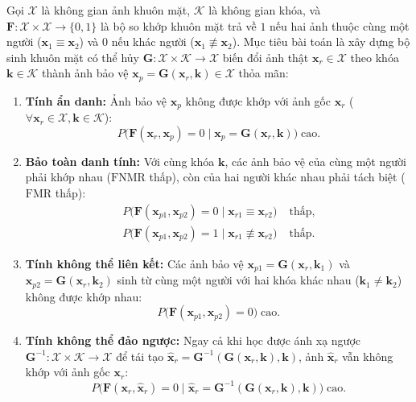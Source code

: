 Gọi $\mathcal{X}$ là không gian ảnh khuôn mặt, $\mathcal{K}$ là không gian khóa, và $\mathbf{F} : \mathcal{X} \times \mathcal{X} \rightarrow \{0, 1\}$ là bộ so khớp khuôn mặt trả về $1$ nếu hai ảnh thuộc cùng một người ($\mathbf{x}_1 \equiv \mathbf{x}_2$) và $0$ nếu khác người ($\mathbf{x}_1 \not\equiv \mathbf{x}_2$). Mục tiêu bài toán là xây dựng bộ sinh khuôn mặt có thể hủy $\mathbf{G} : \mathcal{X} \times \mathcal{K} \rightarrow \mathcal{X}$ biến đổi ảnh thật $\mathbf{x}_r \in \mathcal{X}$ theo khóa $\mathbf{k} \in \mathcal{K}$ thành ảnh bảo vệ $\mathbf{x}_p = \mathbf{G}(\mathbf{x}_r, \mathbf{k}) \in \mathcal{X}$ thỏa mãn:
\begin{enumerate}\setlength{\itemsep}{2pt}\setlength{\parskip}{0pt}
    \item \textbf{Tính ẩn danh:} Ảnh bảo vệ $\mathbf{x}_p$ không được khớp với ảnh gốc $\mathbf{x}_r$ ($\forall \mathbf{x}_r \in \mathcal{X}, \mathbf{k} \in \mathcal{K}$):
    \[
    P\bigl(\mathbf{F}(\mathbf{x}_r, \mathbf{x}_p) = 0 \mid \mathbf{x}_p = \mathbf{G}(\mathbf{x}_r, \mathbf{k})\bigr) \;\text{cao}.
    \]
    \item \textbf{Bảo toàn danh tính:} Với cùng khóa $\mathbf{k}$, các ảnh bảo vệ của cùng một người phải khớp nhau ($\text{FNMR}$ thấp), còn của hai người khác nhau phải tách biệt ($\text{FMR}$ thấp):
    \[
    \begin{aligned}
    P\bigl(\mathbf{F}(\mathbf{x}_{p1}, \mathbf{x}_{p2}) = 0 \mid \mathbf{x}_{r1} \equiv \mathbf{x}_{r2}\bigr) &\;\text{thấp}, \\
    P\bigl(\mathbf{F}(\mathbf{x}_{p1}, \mathbf{x}_{p2}) = 1 \mid \mathbf{x}_{r1} \not\equiv \mathbf{x}_{r2}\bigr) &\;\text{thấp}.
    \end{aligned}
    \]
    \item \textbf{Tính không thể liên kết:} Các ảnh bảo vệ $\mathbf{x}_{p1} = \mathbf{G}(\mathbf{x}_r, \mathbf{k}_1)$ và $\mathbf{x}_{p2} = \mathbf{G}(\mathbf{x}_r, \mathbf{k}_2)$ sinh từ cùng một người với hai khóa khác nhau ($\mathbf{k}_1 \neq \mathbf{k}_2$) không được khớp nhau:
    \[
    P\bigl(\mathbf{F}(\mathbf{x}_{p1}, \mathbf{x}_{p2}) = 0\bigr) \;\text{cao}.
    \]
    \item \textbf{Tính không thể đảo ngược:} Ngay cả khi học được ánh xạ ngược $\mathbf{G}^{-1} : \mathcal{X} \times \mathcal{K} \rightarrow \mathcal{X}$ để tái tạo $\hat{\mathbf{x}}_r = \mathbf{G}^{-1}(\mathbf{G}(\mathbf{x}_r, \mathbf{k}), \mathbf{k})$, ảnh $\hat{\mathbf{x}}_r$ vẫn không khớp với ảnh gốc $\mathbf{x}_r$:
    \[
    P\bigl(\mathbf{F}(\mathbf{x}_r, \hat{\mathbf{x}}_r) = 0 \mid \hat{\mathbf{x}}_r = \mathbf{G}^{-1}(\mathbf{G}(\mathbf{x}_r, \mathbf{k}), \mathbf{k})\bigr) \;\text{cao}.
    \]
\end{enumerate}

